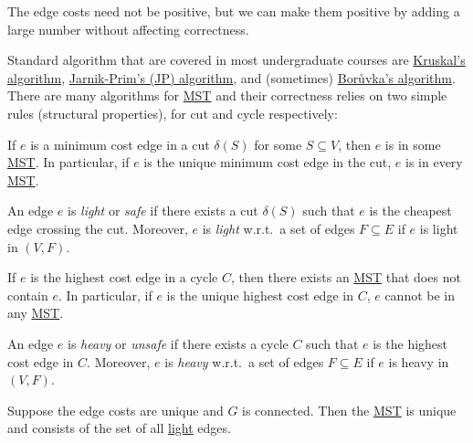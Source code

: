 \begin{remark}
	The edge costs need not be positive, but we can make them positive by adding a large number without affecting correctness.
\end{remark}

Standard algorithm that are covered in most undergraduate courses are \href{https://en.wikipedia.org/wiki/Kruskal%27s_algorithm}{Kruskal's algorithm}, \href{https://en.wikipedia.org/wiki/Prim%27s_algorithm}{Jarnik-Prim's (JP) algorithm}, and (sometimes) \href{https://en.wikipedia.org/wiki/Bor%C5%AFvka%27s_algorithm}{Borůvka's algorithm}. There are many algorithms for \hyperref[prb:MST]{MST} and their correctness relies on two simple rules (structural properties), for cut and cycle respectively:

\begin{lemma}\label{lma:cut-rule}
	If \(e\) is a minimum cost edge in a cut \(\delta (S)\) for some \(S \subseteq V\), then \(e\) is in some \hyperref[prb:MST]{MST}. In particular, if \(e\) is the unique minimum cost edge in the cut, \(e\) is in every \hyperref[prb:MST]{MST}.
\end{lemma}

\begin{definition}[Light]\label{def:light}
	An edge \(e\) is \emph{light} or \emph{safe} if there exists a cut \(\delta (S)\) such that \(e\) is the cheapest edge crossing the cut. Moreover, \(e\) is \emph{light} w.r.t.\ a set of edges \(F \subseteq E\) if \(e\) is light in \((V, F)\).
\end{definition}

\begin{lemma}\label{lma:cycle-rule}
	If \(e\) is the highest cost edge in a cycle \(C\), then there exists an \hyperref[prb:MST]{MST} that does not contain \(e\). In particular, if \(e\) is the unique highest cost edge in \(C\), \(e\) cannot be in any \hyperref[prb:MST]{MST}.
\end{lemma}

\begin{definition}[Heavy]\label{def:heavy}
	An edge \(e\) is \emph{heavy} or \emph{unsafe} if there exists a cycle \(C\) such that \(e\) is the highest cost edge in \(C\). Moreover, \(e\) is \emph{heavy} w.r.t.\ a set of edges \(F \subseteq E\) if \(e\) is heavy in \((V, F)\).
\end{definition}

\begin{corollary}
	Suppose the edge costs are unique and \(G\) is connected. Then the \hyperref[prb:MST]{MST} is unique and consists of the set of all \hyperref[def:light]{light} edges.
\end{corollary}

